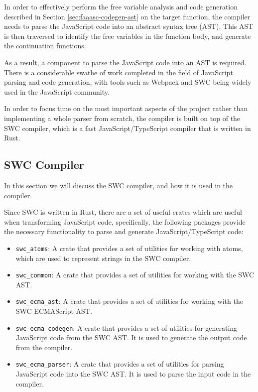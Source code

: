 In order to effectively perform the free variable analysis and code generation described in Section \ref{sec:faaasc-codegen-ast} on the target \faas{} function, the \faaasc{} compiler needs to parse the JavaScript code into an abstract syntax tree (AST). This AST is then traversed to identify the free variables in the function body, and generate the continuation functions.

As a result, a component to parse the JavaScript code into an AST is required. There is a considerable swathe of work completed in the field of JavaScript parsing and code generation, with tools such as Webpack\cite{Webpack} and SWC\cite{RustbasedPlatformWeb} being widely used in the JavaScript community.

In order to focus time on the most important aspects of the project rather than implementing a whole parser from scratch, the \faaasc{} compiler is built on top of the SWC compiler, which is a fast JavaScript/TypeScript compiler that is written in Rust.

\subsection{SWC Compiler}
In this section we will discuss the SWC compiler, and how it is used in the \faaasc{} compiler.

Since SWC is written in Rust, there are a set of useful crates which are useful when transforming JavaScript code, specifically, the following packages provide the necessary functionality to parse and generate JavaScript/TypeScript code:

\begin{itemize}
    \item \verb|swc_atoms|: A crate that provides a set of utilities for working with atoms, which are used to represent strings in the SWC compiler.
    \item \verb|swc_common|: A crate that provides a set of utilities for working with the SWC AST.
    \item \verb|swc_ecma_ast|: A crate that provides a set of utilities for working with the SWC ECMAScript AST.
    \item \verb|swc_ecma_codegen|: A crate that provides a set of utilities for generating JavaScript code from the SWC AST. It is used to generate the output code from the \faaasc{} compiler.
    \item \verb|swc_ecma_parser|: A crate that provides a set of utilities for parsing JavaScript code into the SWC AST. It is used to parse the input code in the \faaasc{} compiler.
\end{itemize}

